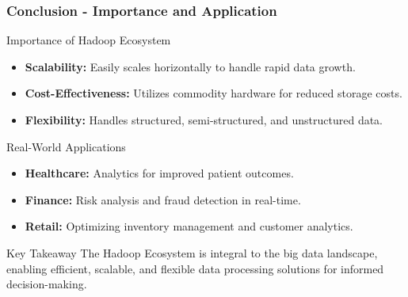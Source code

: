 \documentclass[aspectratio=169]{beamer}
\begin{document}
\begin{frame}[fragile]
    \frametitle{Conclusion - Importance and Application}
    \begin{block}{Importance of Hadoop Ecosystem}
        \begin{itemize}
            \item \textbf{Scalability:} Easily scales horizontally to handle rapid data growth.
            \item \textbf{Cost-Effectiveness:} Utilizes commodity hardware for reduced storage costs.
            \item \textbf{Flexibility:} Handles structured, semi-structured, and unstructured data.
        \end{itemize}
    \end{block}

    \begin{block}{Real-World Applications}
        \begin{itemize}
            \item \textbf{Healthcare:} Analytics for improved patient outcomes.
            \item \textbf{Finance:} Risk analysis and fraud detection in real-time.
            \item \textbf{Retail:} Optimizing inventory management and customer analytics.
        \end{itemize}
    \end{block}
    
    \begin{block}{Key Takeaway}
        The Hadoop Ecosystem is integral to the big data landscape, enabling efficient, scalable, and flexible data processing solutions for informed decision-making.
    \end{block}
\end{frame}
\end{document}
